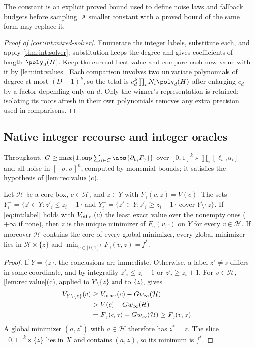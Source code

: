 The constant is an explicit proved bound used to define noise laws and fallback
budgets before sampling. A smaller constant with a proved bound of the same form
may replace it.

\begin{proof}[Proof of \cref{cor:int:mixed-solver}]
Enumerate the integer labels, substitute each, and apply \cref{thm:int:solver};
substitution keeps the degree and gives coefficients of length $\poly_d(H)$.
Keep the current best value and compare each new value with it by
\cref{lem:int:values}. Each comparison involves two univariate polynomials of
degree at most $(D-1)^k$, so the total is $c_d^k\prod_iN_i\poly_d(H)$ after
enlarging $c_d$ by a factor depending only on $d$. Only the winner's
representation is retained; isolating its roots afresh in their own polynomials
removes any extra precision used in comparisons.
\end{proof}

\subsection{Native integer recourse and integer oracles}\label{app:int:native}

Throughout, $G\ge\max\{1,\sup\sum_{i\in C}\abs{\partial_{v_i}F_\gamma}\}$ over
$[0,1]^k\times\prod_i[\ell_i,u_i]$ and all noise in $[-\sigma,\sigma]^n$, computed
by monomial bounds; it satisfies the hypothesis of \cref{lem:rec:value}(c).

\begin{lemma}\label{lem:int:label}
Let $\mathcal H$ be a core box, $c\in\mathcal H$, and $z\in Y$ with
$F_\gamma(c,z)=V(c)$. The sets $Y_i^-=\{z'\in Y:z'_i\le z_i-1\}$ and
$Y_i^+=\{z'\in Y:z'_i\ge z_i+1\}$ cover $Y\setminus\{z\}$. If
\eqref{eq:int:label} holds with $V_{\rm other}(c)$ the least exact value over
the nonempty ones ($+\infty$ if none), then $z$ is the unique minimizer of
$F_\gamma(v,\cdot)$ on $Y$ for every $v\in\mathcal H$. If moreover $\mathcal H$
contains the core of every global minimizer, every global minimizer lies in
$\mathcal H\times\{z\}$ and $\min_{v\in[0,1]^k}F_\gamma(v,z)=f^*$.
\end{lemma}

\begin{proof}
If $Y=\{z\}$, the conclusions are immediate. Otherwise,
a label $z'\ne z$ differs in some coordinate, and by integrality $z'_i\le z_i-1$
or $z'_i\ge z_i+1$. For $v\in\mathcal H$, \cref{lem:rec:value}(c), applied to
$Y\setminus\{z\}$ and to $\{z\}$, gives
\begin{align*}
 V_{Y\setminus\{z\}}(v)&\ge V_{\rm other}(c)-Gw_\infty(\mathcal H)\\
 &>V(c)+Gw_\infty(\mathcal H)\\
 &=F_\gamma(c,z)+Gw_\infty(\mathcal H)\ge F_\gamma(v,z).
\end{align*}
A global minimizer $(a,z^*)$
with $a\in\mathcal H$ therefore has $z^*=z$. The slice
$[0,1]^k\times\{z\}$ lies in $X$ and contains $(a,z)$, so its minimum is $f^*$.
\end{proof}

